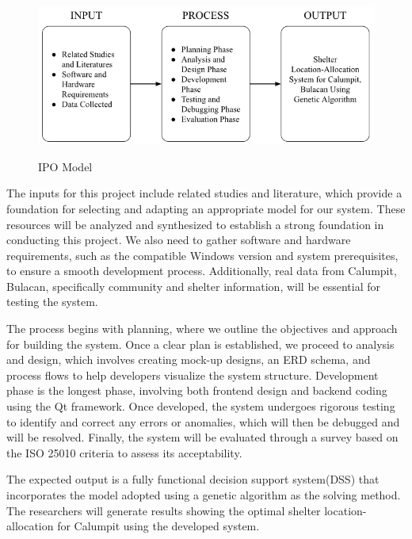 	 \begin{figure}[h!]
		\centering
		\caption{IPO Model} \label{fig:ipo}
		\includegraphics[width=\linewidth]{IPO}
		\label{IPOModel}
	\end{figure}
	
	The inputs for this project include related studies and literature, which provide a foundation for selecting and adapting an appropriate model for our system. These resources will be analyzed and synthesized to establish a strong foundation in conducting this project. We also need to gather software and hardware requirements, such as the compatible Windows version and system prerequisites, to ensure a smooth development process. Additionally, real data from Calumpit, Bulacan, specifically community and shelter information, will be essential for testing the system.
	
	The process begins with planning, where we outline the objectives and approach for building the system. Once a clear plan is established, we proceed to analysis and design, which involves creating mock-up designs, an ERD schema, and process flows to help developers visualize the system structure. Development phase is the longest phase, involving both frontend design and backend coding using the Qt framework. Once developed, the system undergoes rigorous testing to identify and correct any errors or anomalies, which will then be debugged and will be resolved. Finally, the system will be evaluated through a survey based on the ISO 25010 criteria to assess its acceptability.
	
	The expected output is a fully functional decision support system(DSS) that incorporates the  model adopted using a genetic algorithm as the solving method. The researchers will generate results showing the optimal shelter location-allocation for Calumpit using the developed system.
	


